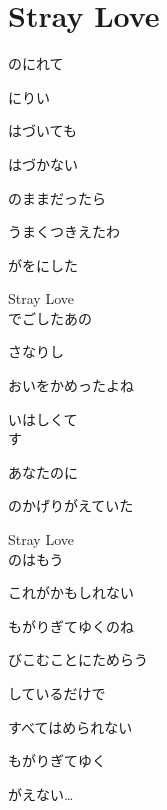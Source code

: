 \section{ Stray Love}
\large{

のにれて

にりい

はづいても

はづかない

のままだったら

うまくつきえたわ

がをにした

Stray Love
\\

でごしたあの

さなりし

おいをかめったよね

いはしくて
\\

す

あなたのに

のかげりがえていた

Stray Love
\\

のはもう

これがかもしれない

もがりぎてゆくのね

びこむことにためらう

しているだけで

すべてはめられない

もがりぎてゆく

がえない…

}